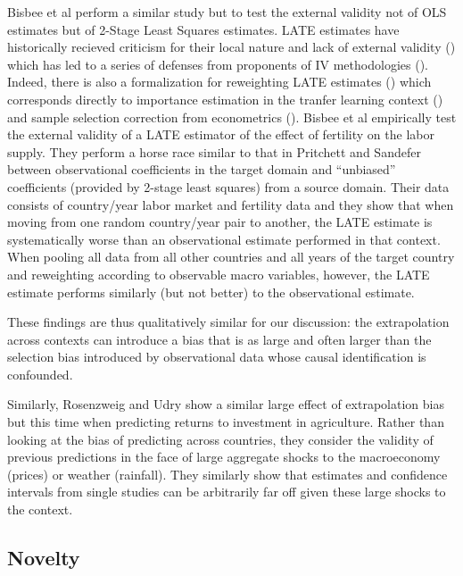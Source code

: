 \documentclass[a4paper,12pt]{article}
\begin{document}
Bisbee et al \parencite*{Bisbee2017} perform a similar study but to test the external validity not of OLS estimates but of 2-Stage Least Squares estimates. LATE estimates have historically recieved criticism for their local nature and lack of external validity (\cite{Deaton2010}) which has led to a series of defenses from proponents of IV methodologies (\cite{Imbens2009}). Indeed, there is also a formalization for reweighting LATE estimates (\cite{Angrist2011}) which corresponds directly to importance estimation in the tranfer learning context (\cite{Suigyama2007}) and sample selection correction from econometrics (\cite{Manski1977}). Bisbee et al empirically test the external validity of a LATE estimator of the effect of fertility on the labor supply. They perform a horse race similar to that in Pritchett and Sandefer \parencite*{Pritchett2016} between observational coefficients in the target domain and ``unbiased'' coefficients (provided by 2-stage least squares) from a source domain. Their data consists of country/year labor market and fertility data and they show that when moving from one random country/year pair to another, the LATE estimate is systematically worse than an observational estimate performed in that context. When pooling all data from all other countries and all years of the target country and reweighting according to observable macro variables, however, the LATE estimate performs similarly (but not better) to the observational estimate.

These findings are thus qualitatively similar for our discussion: the extrapolation across contexts can introduce a bias that is as large and often larger than the selection bias introduced by observational data whose causal identification is confounded.

Similarly, Rosenzweig and Udry \parencite*{Rosenzweig2019} show a similar large effect of extrapolation bias but this time when predicting returns to investment in agriculture. Rather than looking at the bias of predicting across countries, they consider the validity of previous predictions in the face of large aggregate shocks to the macroeconomy (prices) or weather (rainfall). They similarly show that estimates and confidence intervals from single studies can be arbitrarily far off given these large shocks to the context.

\subsection{ Novelty }
\end{document}
